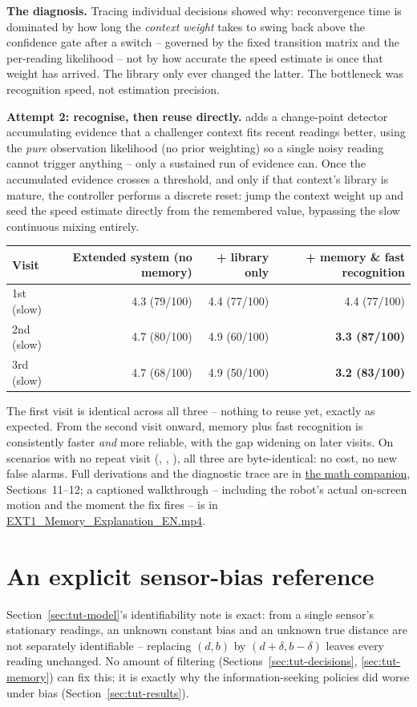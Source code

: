 \documentclass[11pt,a4paper]{article}
\newcommand{\code}[1]{\texttt{\detokenize{#1}}}
\begin{document}
\textbf{The diagnosis.} Tracing individual decisions showed why: reconvergence time is dominated by how long the \emph{context weight} takes to swing back above the confidence gate after a switch -- governed by the fixed transition matrix and the per-reading likelihood -- not by how accurate the speed estimate is once that weight has arrived. The library only ever changed the latter. The bottleneck was recognition speed, not estimation precision.

\textbf{Attempt 2: recognise, then reuse directly.} \code{ext1_memory_fast} adds a change-point detector accumulating evidence that a challenger context fits recent readings better, using the \emph{pure} observation likelihood (no prior weighting) so a single noisy reading cannot trigger anything -- only a sustained run of evidence can. Once the accumulated evidence crosses a threshold, and only if that context's library is mature, the controller performs a discrete reset: jump the context weight up and seed the speed estimate directly from the remembered value, bypassing the slow continuous mixing entirely.

\begin{center}\small
\begin{tabular}{lrrr}\toprule
Visit & Extended system (no memory) & + library only & + memory \& fast recognition\\\midrule
1st (slow) & 4.3 (79/100) & 4.4 (77/100) & 4.4 (77/100)\\
2nd (slow) & 4.7 (80/100) & 4.9 (60/100) & \textbf{3.3 (87/100)}\\
3rd (slow) & 4.7 (68/100) & 4.9 (50/100) & \textbf{3.2 (83/100)}\\
\bottomrule
\end{tabular}\end{center}
The first visit is identical across all three -- nothing to reuse yet, exactly as expected. From the second visit onward, memory plus fast recognition is consistently faster \emph{and} more reliable, with the gap widening on later visits. On scenarios with no repeat visit (\code{switch}, \code{recovery}, \code{normal}), all three are byte-identical: no cost, no new false alarms. Full derivations and the diagnostic trace are in \href{Mathematical_Model_EXT1.pdf}{the math companion}, Sections~11--12; a captioned walkthrough -- including the robot's actual on-screen motion and the moment the fix fires -- is in \href{Mini_IPHOREOS_EXT1_Video/EXT1_Memory_Explanation_EN.mp4}{EXT1\_Memory\_Explanation\_EN.mp4}.

\section{An explicit sensor-bias reference}
\label{sec:tut-bias}
Section~\ref{sec:tut-model}'s identifiability note is exact: from a single sensor's stationary readings, an unknown constant bias and an unknown true distance are not separately identifiable -- replacing $(d,b)$ by $(d+\delta,b-\delta)$ leaves every reading unchanged. No amount of filtering (Sections~\ref{sec:tut-decisions}, \ref{sec:tut-memory}) can fix this; it is exactly why the information-seeking policies did worse under bias (Section~\ref{sec:tut-results}).
\end{document}
